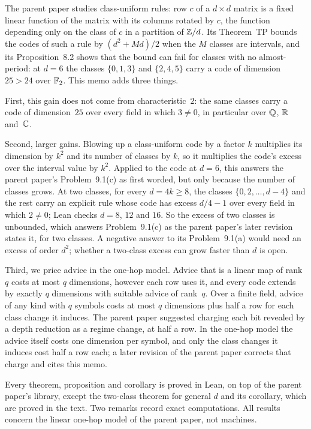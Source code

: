 The parent paper studies class-uniform rules: row $c$ of a $d\times d$ matrix is a fixed linear function of the matrix
with its columns rotated by $c$, the function depending only on the class of $c$ in a partition of $\mathbb{Z}/d$. Its
Theorem~TP bounds the codes of such a rule by $(d^2+Md)/2$ when the $M$ classes are intervals, and its
Proposition~8.2 shows that the bound can fail for classes with no almost-period: at $d=6$ the classes $\{0,1,3\}$ and
$\{2,4,5\}$ carry a code of dimension $25>24$ over $\mathbb{F}_2$. This memo adds three things.

First, this gain does not come from characteristic~$2$: the same classes carry a code of dimension~$25$ over every
field in which $3\ne0$, in particular over $\mathbb{Q}$, $\mathbb{R}$ and~$\mathbb{C}$.

Second, larger gains. Blowing up a class-uniform code by a factor $k$ multiplies its dimension by $k^2$ and its number
of classes by $k$, so it multiplies the code's excess over the interval value by $k^2$. Applied to the code at $d=6$,
this answers the parent paper's Problem~9.1(c) as first worded, but only because the number of classes grows. At two
classes, for every $d=4k\ge8$, the classes $\{0,2,\dots,d-4\}$ and the rest carry an explicit rule whose code has
excess $d/4-1$ over every field in which $2\ne0$; Lean checks $d=8$, $12$ and $16$. So the excess of two classes is
unbounded, which answers Problem~9.1(c) as the parent paper's later revision states it, for two classes. A negative
answer to its Problem~9.1(a) would need an excess of order $d^2$; whether a two-class excess can grow faster than $d$ is
open.

Third, we price advice in the one-hop model. Advice that is a linear map of rank $q$ costs at most $q$ dimensions,
however each row uses it, and every code extends by exactly $q$ dimensions with suitable advice of rank~$q$. Over a
finite field, advice of any kind with $q$ symbols costs at most $q$ dimensions plus half a row for each class change it
induces. The parent paper suggested charging each bit revealed by a depth reduction as a regime change, at half a row.
In the one-hop model the advice itself costs one dimension per symbol, and only the class changes it induces cost half
a row each; a later revision of the parent paper corrects that charge and cites this memo.

Every theorem, proposition and corollary is proved in Lean, on top of the parent paper's library, except the
two-class theorem for general $d$ and its corollary, which are proved in the text. Two remarks record exact
computations. All results concern the linear one-hop model of the parent paper, not machines.
